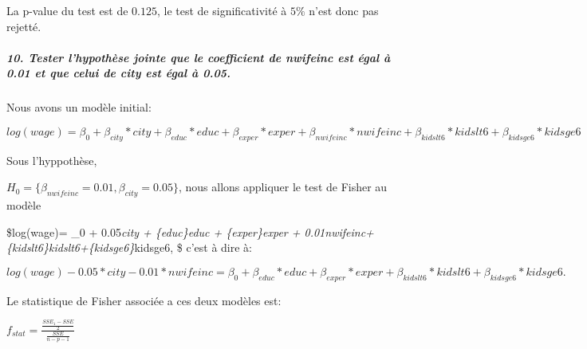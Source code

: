 \documentclass[11pt]{article}
\begin{document}
    La p-value du test est de \(0.125\), le test de significativité à
\(5\%\) n'est donc pas rejetté.

    \hypertarget{tester-lhypothuxe8se-jointe-que-le-coefficient-de-nwifeinc-est-uxe9gal-uxe0-0.01-et-que-celui-de-city-est-uxe9gal-uxe0-0.05.}{%
\subparagraph{10. Tester l'hypothèse jointe que le coefficient de
nwifeinc est égal à 0.01 et que celui de city est égal à
0.05.}\label{tester-lhypothuxe8se-jointe-que-le-coefficient-de-nwifeinc-est-uxe9gal-uxe0-0.01-et-que-celui-de-city-est-uxe9gal-uxe0-0.05.}}

    Nous avons un modèle initial:

\(log(wage)= \beta_0 + \beta_{city}*city + \beta_{educ}*educ + \beta_{exper}*exper +\beta_{nwifeinc}*nwifeinc+ \beta_{kidslt6}*kidslt6+\beta_{kidsge6}*kidsge6\)

    Sous l'hyppothèse,

\(H_0=\{ \beta_{nwifeinc}=0.01 , \beta_{city}=0.05 \}\), nous allons
appliquer le test de Fisher au modèle

\$log(wage)= \beta\_0 + 0.05\emph{city + \beta\emph{\{educ\}\emph{educ +
\beta\emph{\{exper\}\emph{exper + 0.01}nwifeinc+
\beta}\{kidslt6\}}kidslt6+\beta}\{kidsge6\}}kidsge6, \$ c'est à dire à:

\(log(wage)- 0.05*city- 0.01*nwifeinc=\beta_0 + \beta_{educ}*educ + \beta_{exper}*exper + \beta_{kidslt6}*kidslt6+\beta_{kidsge6}*kidsge6.\)

    Le statistique de Fisher associée a ces deux modèles est:

\(f_{stat} = \frac{\frac{SSE_1-SSE}{2}}{\frac{SSE}{n-p-1}}\)
\end{document}

